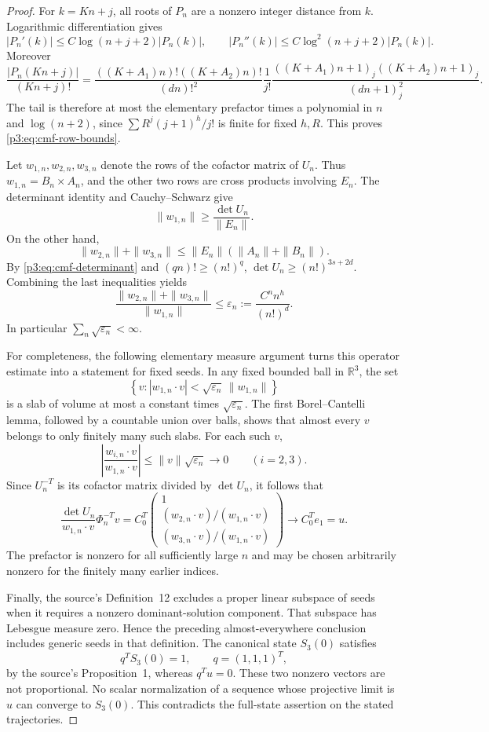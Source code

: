 \documentclass[11pt,a4paper]{article}
\theoremstyle{definition}
\theoremstyle{remark}
\numberwithin{equation}{section}
\begin{document}
\begin{proof}
For $k=Kn+j$, all roots of $P_n$ are a nonzero integer distance from
$k$. Logarithmic differentiation gives
\[
 |P_n'(k)|\leq C\log(n+j+2)|P_n(k)|,\qquad
 |P_n''(k)|\leq C\log^2(n+j+2)|P_n(k)|.
\]
Moreover
\[
 \frac{|P_n(Kn+j)|}{(Kn+j)!}
 =\frac{((K+A_1)n)!((K+A_2)n)!}{(dn)!^2}
   \frac1{j!}
   \frac{((K+A_1)n+1)_j((K+A_2)n+1)_j}{(dn+1)_j^2}.
\]
The tail is therefore at most the elementary prefactor times a polynomial
in $n$ and $\log(n+2)$, since $\sum R^j(j+1)^h/j!$ is finite for
fixed $h,R$. This proves \eqref{p3:eq:cmf-row-bounds}.

Let $w_{1,n},w_{2,n},w_{3,n}$ denote the rows of the cofactor matrix of
$U_n$. Thus $w_{1,n}=B_n\times A_n$, and the other two rows are cross
products involving $E_n$. The determinant identity and Cauchy--Schwarz
give
\[
 \|w_{1,n}\|\geq\frac{\det U_n}{\|E_n\|}.
\]
On the other hand,
\[
 \|w_{2,n}\|+\|w_{3,n}\|
 \leq\|E_n\|(\|A_n\|+\|B_n\|).
\]
By \eqref{p3:eq:cmf-determinant} and $(qn)!\geq(n!)^q$,
$\det U_n\geq(n!)^{3s+2d}$. Combining the last inequalities yields
\begin{equation}
 \frac{\|w_{2,n}\|+\|w_{3,n}\|}{\|w_{1,n}\|}
 \leq\varepsilon_n:=\frac{C^n n^h}{(n!)^d}.
 \label{p3:eq:cmf-cofactor-separation}
\end{equation}
In particular $\sum_n\sqrt{\varepsilon_n}<\infty$.

For completeness, the following elementary measure argument turns this
operator estimate into a statement for fixed seeds. In any fixed bounded
ball in $\mathbb R^3$, the set
\[
 \left\{v:|w_{1,n}\cdot v|<
                  \sqrt{\varepsilon_n}\,\|w_{1,n}\|\right\}
\]
is a slab of volume at most a constant times $\sqrt{\varepsilon_n}$.
The first Borel--Cantelli lemma, followed by a countable union over balls,
shows that almost every $v$ belongs to only finitely many such slabs.
For each such $v$,
\[
 \left|\frac{w_{i,n}\cdot v}{w_{1,n}\cdot v}\right|
 \leq\|v\|\sqrt{\varepsilon_n}\longrightarrow0
 \qquad(i=2,3).
\]
Since $U_n^{-T}$ is its cofactor matrix divided by $\det U_n$, it follows
that
\[
 \frac{\det U_n}{w_{1,n}\cdot v}\Phi_n^{-T}v
 =C_0^T\begin{pmatrix}1\\
    (w_{2,n}\cdot v)/(w_{1,n}\cdot v)\\
    (w_{3,n}\cdot v)/(w_{1,n}\cdot v)\end{pmatrix}
 \longrightarrow C_0^T e_1=u.
\]
The prefactor is nonzero for all sufficiently large $n$ and may be
chosen arbitrarily nonzero for the finitely many earlier indices.

Finally, the source's Definition~12 excludes a proper linear subspace
of seeds when it requires a nonzero dominant-solution component.
That subspace has Lebesgue measure zero. Hence the preceding almost-everywhere
conclusion includes generic seeds in that definition. The canonical
state $S_3(0)$ satisfies
\[
 q^TS_3(0)=1,\qquad q=(1,1,1)^T,
\]
by the source's Proposition~1, whereas $q^Tu=0$. These two nonzero vectors
are not proportional. No scalar normalization of a sequence whose
projective limit is $u$ can converge to $S_3(0)$. This contradicts the
full-state assertion on the stated trajectories.
\end{proof}
\end{document}
